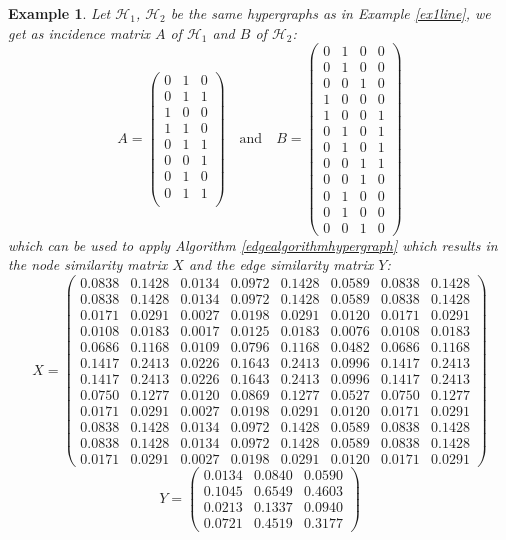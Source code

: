 \documentclass[a4paper,11pt]{report}
\newtheorem{example}[theorem]{Example}
\newcommand{\hgrafeen}{\mathcal{H}}
\begin{document}
\begin{example}
  Let $\hgrafeen_1$, $\hgrafeen_2$ be the same hypergraphs as in Example \ref{ex1line}, we get as incidence matrix $A$ of 
  $\hgrafeen_1$ and $B$ of $\hgrafeen_2$:
  $$A = \begin{pmatrix}
  0&1&0\\
0&1&1\\
1&0&0\\
1&1&0\\
0&1&1\\
0&0&1\\
0&1&0\\
0&1&1\\
\end{pmatrix} \quad \text{and} \quad
B = \begin{pmatrix}
  0&1&0&0\\
0&1&0&0\\
0&0&1&0\\
1&0&0&0\\
1&0&0&1\\
0&1&0&1\\
0&1&0&1\\
0&0&1&1\\
0&0&1&0\\
0&1&0&0\\
0&1&0&0\\
0&0&1&0
\end{pmatrix}$$
which can be used to apply Algorithm \ref{edgealgorithmhypergraph} which results in the node similarity matrix $X$ and the edge similarity matrix 
$Y$:
$$ X = \begin{pmatrix}
0.0838&0.1428&0.0134&0.0972&0.1428&0.0589&0.0838&0.1428\\
0.0838&0.1428&0.0134&0.0972&0.1428&0.0589&0.0838&0.1428\\
0.0171&0.0291&0.0027&0.0198&0.0291&0.0120&0.0171&0.0291\\
0.0108&0.0183&0.0017&0.0125&0.0183&0.0076&0.0108&0.0183\\
0.0686&0.1168&0.0109&0.0796&0.1168&0.0482&0.0686&0.1168\\
0.1417&0.2413&0.0226&0.1643&0.2413&0.0996&0.1417&0.2413\\
0.1417&0.2413&0.0226&0.1643&0.2413&0.0996&0.1417&0.2413\\
0.0750&0.1277&0.0120&0.0869&0.1277&0.0527&0.0750&0.1277\\
0.0171&0.0291&0.0027&0.0198&0.0291&0.0120&0.0171&0.0291\\
0.0838&0.1428&0.0134&0.0972&0.1428&0.0589&0.0838&0.1428\\
0.0838&0.1428&0.0134&0.0972&0.1428&0.0589&0.0838&0.1428\\
0.0171&0.0291&0.0027&0.0198&0.0291&0.0120&0.0171&0.0291
\end{pmatrix}$$
$$Y = \begin{pmatrix}
0.0134&0.0840&0.0590\\
0.1045&0.6549&0.4603\\
0.0213&0.1337&0.0940\\
0.0721&0.4519&0.3177
\end{pmatrix}$$



\end{example}
\end{document}
